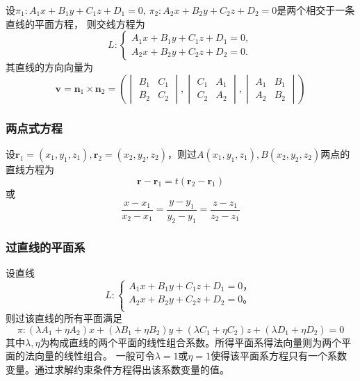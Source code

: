 设$\pi_1 : A_1x + B_1y + C_1z + D_1 = 0,\, \pi_2 : A_2x + B_2y + C_2z + D_2 = 0$是两个相交于一条直线的平面方程，
则交线方程为
\begin{equation}
    \label{eq:直线交面式方程}
    L:\begin{cases}
        A_1x + B_1y + C_1z + D_1 = 0, \\
        A_2x + B_2y + C_2z + D_2 = 0.
    \end{cases}
\end{equation}
其直线的方向向量为
\[
    \bm{v} = \bm{n}_1\times\bm{n}_2 =
    \left(
    \begin{vmatrix}
            B_1 & C_1 \\
            B_2 & C_2
        \end{vmatrix},
    \begin{vmatrix}
            C_1 & A_1 \\
            C_2 & A_2
        \end{vmatrix},
    \begin{vmatrix}
            A_1 & B_1 \\
            A_2 & B_2
        \end{vmatrix}
    \right)
\]

\subsubsection{两点式方程}
设$\bm{r}_1=(x_1,y_1,z_1),\bm{r}_2=(x_2,y_2,z_2)$，则过$A(x_1,y_1,z_1),B(x_2,y_2,z_2)$两点的直线方程为
\begin{equation}
    \bm{r}-\bm{r}_1 = t(\bm{r}_2-\bm{r}_1)
\end{equation}
或
\begin{equation}
    \label{eq:直线两点式方程}
    \frac{x-x_1}{x_2-x_1} = \frac{y-y_1}{y_2-y_1} = \frac{z-z_1}{z_2-z_1}
\end{equation}

\subsubsection{过直线的平面系}
设直线
\[
    L: \begin{cases}
        A_1x+B_1y+C_1z+D_1 = 0， \\
        A_2x+B_2y+C_2z+D_2 = 0。 \\
    \end{cases}
\]
则过该直线的所有平面满足
\begin{equation}
    \pi :  (\lambda A_1 + \eta A_2)x + (\lambda B_1 + \eta B_2)y + (\lambda C_1 + \eta C_2)z + (\lambda D_1 + \eta D_2)=0
\end{equation}
其中$\lambda,\eta$为构成直线的两个平面的线性组合系数。所得平面系得法向量则为两个平面的法向量的线性组合。
一般可令$\lambda=1$或$\eta=1$使得该平面系方程只有一个系数变量。通过求解约束条件方程得出该系数变量的值。

